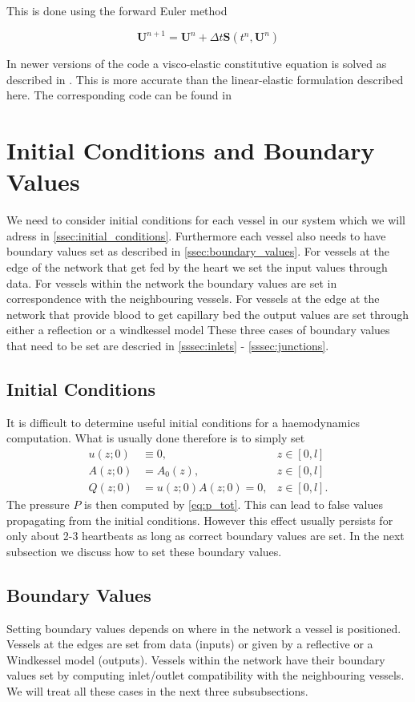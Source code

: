 \documentclass[a4paper, oneside]{discothesis}
\begin{document}
This is done using the forward Euler method

\begin{equation}
	\mathbf{U}^{n+1}=\mathbf{U}^n + \Delta t \mathbf{S}\left(t^n, \mathbf{U}^n\right)
\end{equation}

In newer versions of the code a visco-elastic constitutive equation is solved as described in \cite{ALASTRUEY20112250}.
This is more accurate than the linear-elastic formulation described here.
The corresponding code can be found in 

\section{Initial Conditions and Boundary Values} \label{sec:icbc}
We need to consider initial conditions for each vessel in our system which we will adress in \autoref{ssec:initial_conditions}.
Furthermore each vessel also needs to have boundary values set as described in \autoref{ssec:boundary_values}.
For vessels at the edge of the network that get fed by the heart we set the input values through data.
For vessels within the network the boundary values are set in correspondence with the neighbouring vessels.
For vessels at the edge at the network that provide blood to get capillary bed the output values are set through either a reflection or a windkessel model
These three cases of boundary values that need to be set are descried in \autoref{sssec:inlets} - \autoref{sssec:junctions}.
\subsection{Initial Conditions} \label{ssec:initial_conditions}
It is difficult to determine useful initial conditions for a haemodynamics computation.
What is usually done therefore is to simply set
\begin{align}
	u(z;0) &\equiv 0, &z \in [0,l]\\
	A(z;0) &= A_0(z), &z \in [0,l] \\
	Q(z;0) &= u(z;0)A(z;0) = 0, &z \in [0,l].
\end{align}
The pressure $P$ is then computed by \autoref{eq:p_tot}.
This can lead to false values propagating from the initial conditions.
However this effect usually persists for only about 2-3 heartbeats as long as correct boundary values are set.\cite{formaggia2010cardiovascular}
In the next subsection we discuss how to set these boundary values. 

\subsection{Boundary Values} \label{ssec:boundary_values}
Setting boundary values depends on where in the network a vessel is positioned.
Vessels at the edges are set from data (inputs) or given by a reflective or a Windkessel model (outputs).
Vessels within the network have their boundary values set by computing inlet/outlet compatibility with the neighbouring vessels.
We will treat all these cases in the next three subsubsections.
\end{document}
